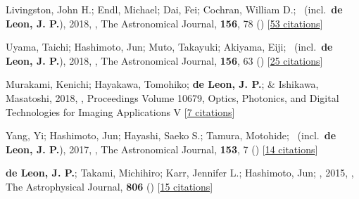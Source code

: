 \item[{\color{numcolor}\scriptsize5}] Livingston, John H.; Endl, Michael; Dai, Fei; Cochran, William D.; \etal\ (incl.\ \textbf{de Leon, J. P.}), 2018, , The Astronomical Journal, \textbf{156}, 78 () [\href{https://ui.adsabs.harvard.edu/abs/2018AJ....156...78L}{53 citations}]

\item[{\color{numcolor}\scriptsize4}] Uyama, Taichi; Hashimoto, Jun; Muto, Takayuki; Akiyama, Eiji; \etal\ (incl.\ \textbf{de Leon, J. P.}), 2018, , The Astronomical Journal, \textbf{156}, 63 () [\href{https://ui.adsabs.harvard.edu/abs/2018AJ....156...63U}{25 citations}]

\item[{\color{numcolor}\scriptsize3}] Murakami, Kenichi; Hayakawa, Tomohiko; \textbf{de Leon, J. P.}; \& Ishikawa, Masatoshi, 2018, , Proceedings Volume 10679, Optics, Photonics, and Digital Technologies for Imaging Applications V [\href{https://www.spiedigitallibrary.org/conference-proceedings-of-spie/10679/2306621/Real-time-high-speed-motion-blur-compensation-method-using-galvanometer/10.1117/12.2306621.short}{7 citations}]

\item[{\color{numcolor}\scriptsize2}] Yang, Yi; Hashimoto, Jun; Hayashi, Saeko S.; Tamura, Motohide; \etal\ (incl.\ \textbf{de Leon, J. P.}), 2017, , The Astronomical Journal, \textbf{153}, 7 () [\href{https://ui.adsabs.harvard.edu/abs/2017AJ....153....7Y}{14 citations}]

\item[{\color{numcolor}\scriptsize1}] \textbf{de Leon, J. P.}; Takami, Michihiro; Karr, Jennifer L.; Hashimoto, Jun; \etal, 2015, , The Astrophysical Journal, \textbf{806} () [\href{https://ui.adsabs.harvard.edu/abs/2015ApJ...806L..10D}{15 citations}]